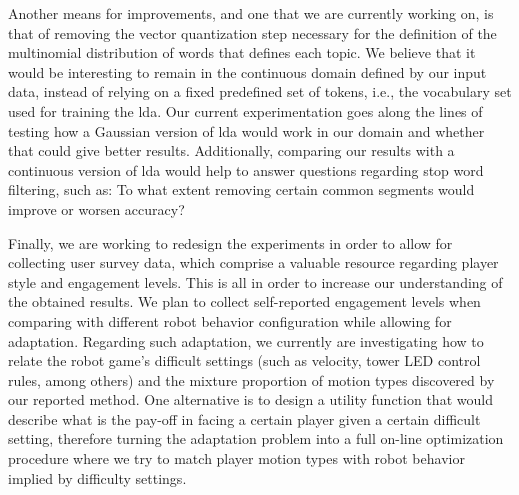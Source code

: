 Another means for improvements, and one that we are currently working on, is that of removing the vector quantization step necessary for the definition of the multinomial distribution of words that defines each topic. We believe that it would be interesting to remain in the continuous domain defined by our input data, instead of relying on a fixed predefined set of tokens, i.e., the vocabulary set used for training the \gls{lda}. Our current experimentation goes along the lines of testing how a Gaussian version of \gls{lda} would work in our domain and whether that could give better results. Additionally, comparing our results with a continuous version of \gls{lda} would help to answer questions regarding {stop word} filtering, such as: To what extent removing certain common segments would improve or worsen accuracy?

Finally, we are working to redesign the experiments in order to allow for collecting user survey data, which comprise a valuable resource regarding player style and engagement levels. This is all in order to increase our understanding of the obtained results. We plan to collect self-reported engagement levels when comparing with different robot behavior configuration while allowing for adaptation. Regarding such adaptation, we currently are investigating how to relate the robot game's difficult settings (such as velocity, tower LED control rules, among others) and the mixture proportion of motion types discovered by our reported method. One alternative is to design a utility function that would describe what is the pay-off in facing a certain player given a certain difficult setting, therefore turning the adaptation problem into a full on-line optimization procedure where we try to match player motion types with robot behavior implied by difficulty settings.

